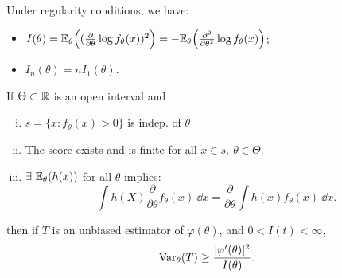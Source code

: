 \begin{prop}
	Under regularity conditions, we have:
	\begin{itemize}
		\item $I(\theta) = \mathbb{E}_\theta \Big(  (\frac{\partial}{\partial \theta} \log f_\theta (x))^2 \Big) = - \mathbb{E}_\theta \Big( \frac{\partial^2}{\partial \theta^2} \log f_\theta (x) \Big)$;
		\item $I_n(\theta) = n I_1 (\theta)$.
	\end{itemize}
	\end{prop}

\begin{thm}
	If $\Theta \subset \mathbb{R}$ is an open interval and
	\begin{enumerate}[(i)]
		\item $s = \{ x: f_\theta(x)>0 \}$ is indep. of $\theta$
		\item The score exists and is finite for all $x \in s,\ \theta \in \Theta$.
		\item $\exists \ \mathbb{E}_\theta (h(x))$ for all $\theta$ implies:
		$$\int h(X) \frac{\partial}{\partial \theta} f_\theta (x) \ \dd x = \frac{\partial}{\partial \theta} \int h(x) f_\theta (x) \ \dd x.$$
	\end{enumerate}
	then if $T$ is an unbiased estimator of $\varphi(\theta)$, and $0< I(t) < \infty$,
	$$\mathrm{Var}_\theta (T) \geq \frac{ [\varphi'(\theta)]^2 } { I(\theta)}.$$
\end{thm}
